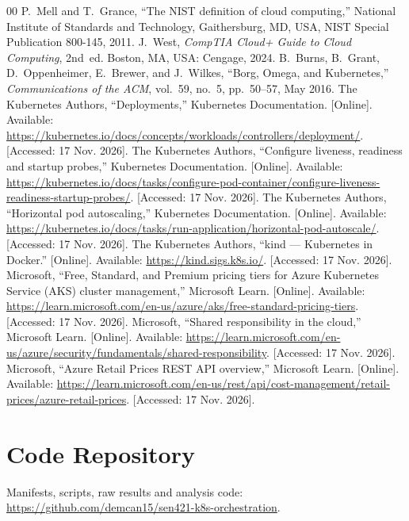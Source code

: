 \documentclass[conference,a4paper]{IEEEtran}
\begin{document}
\begin{thebibliography}{00}
 P.~Mell and T.~Grance, ``The NIST definition of cloud computing,'' National Institute of Standards and Technology, Gaithersburg, MD, USA, NIST Special Publication 800-145, 2011.
 J.~West, \textit{CompTIA Cloud+ Guide to Cloud Computing}, 2nd~ed. Boston, MA, USA: Cengage, 2024.
 B.~Burns, B.~Grant, D.~Oppenheimer, E.~Brewer, and J.~Wilkes, ``Borg, Omega, and Kubernetes,'' \textit{Communications of the ACM}, vol.~59, no.~5, pp.~50--57, May 2016.
 The Kubernetes Authors, ``Deployments,'' Kubernetes Documentation. [Online]. Available: \url{https://kubernetes.io/docs/concepts/workloads/controllers/deployment/}. [Accessed: 17 Nov. 2026].
 The Kubernetes Authors, ``Configure liveness, readiness and startup probes,'' Kubernetes Documentation. [Online]. Available: \url{https://kubernetes.io/docs/tasks/configure-pod-container/configure-liveness-readiness-startup-probes/}. [Accessed: 17 Nov. 2026].
 The Kubernetes Authors, ``Horizontal pod autoscaling,'' Kubernetes Documentation. [Online]. Available: \url{https://kubernetes.io/docs/tasks/run-application/horizontal-pod-autoscale/}. [Accessed: 17 Nov. 2026].
 The Kubernetes Authors, ``kind --- Kubernetes in Docker.'' [Online]. Available: \url{https://kind.sigs.k8s.io/}. [Accessed: 17 Nov. 2026].
 Microsoft, ``Free, Standard, and Premium pricing tiers for Azure Kubernetes Service (AKS) cluster management,'' Microsoft Learn. [Online]. Available: \url{https://learn.microsoft.com/en-us/azure/aks/free-standard-pricing-tiers}. [Accessed: 17 Nov. 2026].
 Microsoft, ``Shared responsibility in the cloud,'' Microsoft Learn. [Online]. Available: \url{https://learn.microsoft.com/en-us/azure/security/fundamentals/shared-responsibility}. [Accessed: 17 Nov. 2026].
 Microsoft, ``Azure Retail Prices REST API overview,'' Microsoft Learn. [Online]. Available: \url{https://learn.microsoft.com/en-us/rest/api/cost-management/retail-prices/azure-retail-prices}. [Accessed: 17 Nov. 2026].
\end{thebibliography}

\appendix
\section{Code Repository}
\label{app:code}
Manifests, scripts, raw results and analysis code: \url{https://github.com/demcan15/sen421-k8s-orchestration}.
\end{document}
